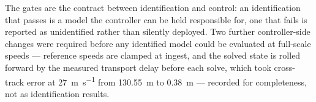 The gates are the contract between identification and control: an
identification that passes is a model the controller can be held responsible
for, one that fails is reported as unidentified rather than silently deployed.
Two further controller-side changes were required before any identified model
could be evaluated at full-scale speeds --- reference speeds are clamped at
ingest, and the solved state is rolled forward by the measured transport delay
before each solve, which took cross-track error at \SI{27}{\meter\per\second}
from \SI{130.55}{\meter} to \SI{0.38}{\meter} --- recorded for completeness,
not as identification results.
